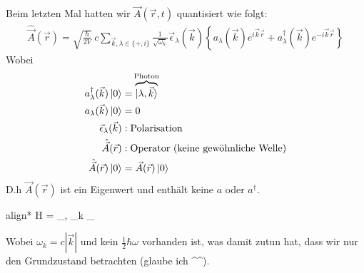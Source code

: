 	Beim letzten Mal hatten wir $\vec{A} (\vec{r}, t)$ quantisiert wie folgt:
		\begin{align*}
			\hat{\vec{A}} (\vec{r})= \sqrt{\frac{\hbar}{2V}} ~c
			\sum_{\vec{k}, \lambda \in \{+ , i\}}
			\frac{1}{\sqrt{\omega_k}} \vec{\epsilon}_\lambda (\vec{k}) 
			\left\{ a_\lambda (\vec{k}) e^{i \vec{k} \vec{r}}
			+ a^\dagger_\lambda (\vec{k}) e^{-i \vec{k} \vec{r}}
			\right\}
		\end{align*}
	Wobei
		\begin{align*}
			a^\dagger_\lambda (\vec{k}) \ket{0} 
			&= \overbrace{\ket{\lambda, \vec{k}}}^{\mathclap{\text{Photon}}} \\
			a_\lambda (\vec{k}) \ket{0} &= 0 \\
			\vec{\epsilon}_\lambda (\vec{k}) &: \text{Polarisation} \\
			\hat{\vec{A}} (\vec{r}) &: \text{Operator (keine gewöhnliche Welle)} \\
			\hat{\vec{A}} (\vec{r}) \ket{0} &= \vec{A} (\vec{r})\ket{0} 
		\end{align*}
	D.h $\vec{A} (\vec{r})$ ist ein Eigenwert und enthält keine $a$ oder $a^\dagger$.
		\begin{empheq}[box=\boxed]{align*}
			H = \sum_{, \lambda} \hbar \omega_k
			_{}
		\end{empheq}
	Wobei $\omega_k = c |\vec{k}|$ und kein $\frac{1}{2} \hbar \omega$ vorhanden ist, was damit zutun hat, dass wir nur den Grundzustand betrachten (glaube ich \^{}\^{}).
	
